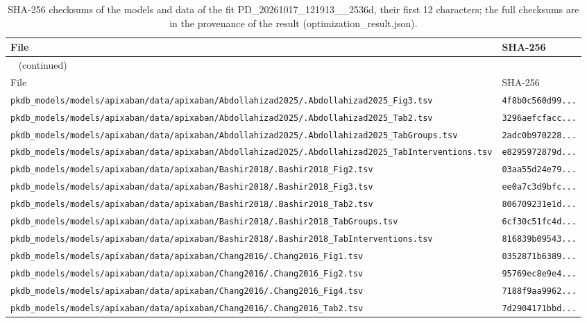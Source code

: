\begin{longtable}{ll}
\caption{SHA-256 checksums of the models and data of the fit PD\_20261017\_121913\_\_2536d, their first 12 characters; the full checksums are in the provenance of the result (optimization\_result.json).}\label{tab:checksums:PD_20261017_121913__2536d} \\
\toprule
File & SHA-256 \\
\midrule
\endfirsthead
\multicolumn{2}{l}{\small\tablename~\thetable{} (continued)} \\
\toprule
File & SHA-256 \\
\midrule
\endhead
\bottomrule
\endlastfoot
\texttt{pkdb\_models/models/apixaban/data/apixaban/Abdollahizad2025/.Abdollahizad2025\_Fig3.tsv} & \texttt{4f8b0c560d99...} \\
\texttt{pkdb\_models/models/apixaban/data/apixaban/Abdollahizad2025/.Abdollahizad2025\_Tab2.tsv} & \texttt{3296aefcfacc...} \\
\texttt{pkdb\_models/models/apixaban/data/apixaban/Abdollahizad2025/.Abdollahizad2025\_TabGroups.tsv} & \texttt{2adc0b970228...} \\
\texttt{pkdb\_models/models/apixaban/data/apixaban/Abdollahizad2025/.Abdollahizad2025\_TabInterventions.tsv} & \texttt{e8295972879d...} \\
\texttt{pkdb\_models/models/apixaban/data/apixaban/Bashir2018/.Bashir2018\_Fig2.tsv} & \texttt{03aa55d24e79...} \\
\texttt{pkdb\_models/models/apixaban/data/apixaban/Bashir2018/.Bashir2018\_Fig3.tsv} & \texttt{ee0a7c3d9bfc...} \\
\texttt{pkdb\_models/models/apixaban/data/apixaban/Bashir2018/.Bashir2018\_Tab2.tsv} & \texttt{806709231e1d...} \\
\texttt{pkdb\_models/models/apixaban/data/apixaban/Bashir2018/.Bashir2018\_TabGroups.tsv} & \texttt{6cf30c51fc4d...} \\
\texttt{pkdb\_models/models/apixaban/data/apixaban/Bashir2018/.Bashir2018\_TabInterventions.tsv} & \texttt{816839b09543...} \\
\texttt{pkdb\_models/models/apixaban/data/apixaban/Chang2016/.Chang2016\_Fig1.tsv} & \texttt{0352871b6389...} \\
\texttt{pkdb\_models/models/apixaban/data/apixaban/Chang2016/.Chang2016\_Fig2.tsv} & \texttt{95769ec8e9e4...} \\
\texttt{pkdb\_models/models/apixaban/data/apixaban/Chang2016/.Chang2016\_Fig4.tsv} & \texttt{7188f9aa9962...} \\
\texttt{pkdb\_models/models/apixaban/data/apixaban/Chang2016/.Chang2016\_Tab2.tsv} & \texttt{7d2904171bbd...} \\

\end{longtable}
